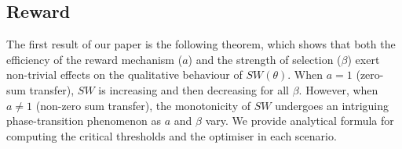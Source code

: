 \documentclass{article}
\begin{document}
\subsection{Reward}
The first result of our paper is the following theorem, which shows that both the efficiency of the reward mechanism ($a$) and the strength of selection ($\beta$) exert non-trivial effects on the qualitative behaviour of $SW(\theta)$. When $a=1$ (zero-sum transfer), $SW$ is increasing and then decreasing for all $\beta$. However, when $a\neq 1$ (non-zero sum transfer), the monotonicity of $SW$ undergoes an intriguing phase-transition phenomenon as $a$ and $\beta$ vary. We provide analytical formula for computing the critical thresholds and the optimiser in each scenario.
\end{document}
